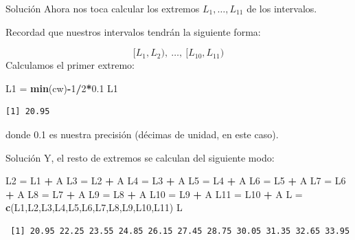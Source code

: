 \documentclass[
  ignorenonframetext,
]{beamer}
\newenvironment{Shaded}{\begin{snugshade}}{\end{snugshade}}
\newcommand{\DecValTok}[1]{\textcolor[rgb]{0.00,0.00,0.81}{#1}}
\newcommand{\FloatTok}[1]{\textcolor[rgb]{0.00,0.00,0.81}{#1}}
\newcommand{\FunctionTok}[1]{\textcolor[rgb]{0.13,0.29,0.53}{\textbf{#1}}}
\newcommand{\NormalTok}[1]{#1}
\newcommand{\OtherTok}[1]{\textcolor[rgb]{0.56,0.35,0.01}{#1}}
\newcommand{\SpecialCharTok}[1]{\textcolor[rgb]{0.81,0.36,0.00}{\textbf{#1}}}
\begin{document}
\begin{frame}[fragile]{Solución}
\label{soluciuxf3n-5}
Ahora nos toca calcular los extremos \(L_1,\dots,L_{11}\) de los
intervalos.

Recordad que nuestros intervalos tendrán la siguiente forma:

\[[L_1,L_2),\ \dots,\ [L_{10},L_{11})\] Calculamos el primer extremo:

\begin{Shaded}
\begin{Highlighting}[]
\NormalTok{L1 }\OtherTok{=} \FunctionTok{min}\NormalTok{(cw)}\SpecialCharTok{{-}}\DecValTok{1}\SpecialCharTok{/}\DecValTok{2}\SpecialCharTok{*}\FloatTok{0.1}
\NormalTok{L1}
\end{Highlighting}
\end{Shaded}

\begin{verbatim}
[1] 20.95
\end{verbatim}

donde 0.1 es nuestra precisión (décimas de unidad, en este caso).
\end{frame}

\begin{frame}[fragile]{Solución}
\label{soluciuxf3n-6}
Y, el resto de extremos se calculan del siguiente modo:

\begin{Shaded}
\begin{Highlighting}[]
\NormalTok{L2 }\OtherTok{=}\NormalTok{ L1 }\SpecialCharTok{+}\NormalTok{ A}
\NormalTok{L3 }\OtherTok{=}\NormalTok{ L2 }\SpecialCharTok{+}\NormalTok{ A}
\NormalTok{L4 }\OtherTok{=}\NormalTok{ L3 }\SpecialCharTok{+}\NormalTok{ A}
\NormalTok{L5 }\OtherTok{=}\NormalTok{ L4 }\SpecialCharTok{+}\NormalTok{ A}
\NormalTok{L6 }\OtherTok{=}\NormalTok{ L5 }\SpecialCharTok{+}\NormalTok{ A}
\NormalTok{L7 }\OtherTok{=}\NormalTok{ L6 }\SpecialCharTok{+}\NormalTok{ A}
\NormalTok{L8 }\OtherTok{=}\NormalTok{ L7 }\SpecialCharTok{+}\NormalTok{ A}
\NormalTok{L9 }\OtherTok{=}\NormalTok{ L8 }\SpecialCharTok{+}\NormalTok{ A}
\NormalTok{L10 }\OtherTok{=}\NormalTok{ L9 }\SpecialCharTok{+}\NormalTok{ A}
\NormalTok{L11 }\OtherTok{=}\NormalTok{ L10 }\SpecialCharTok{+}\NormalTok{ A}
\NormalTok{L }\OtherTok{=} \FunctionTok{c}\NormalTok{(L1,L2,L3,L4,L5,L6,L7,L8,L9,L10,L11)}
\NormalTok{L}
\end{Highlighting}
\end{Shaded}

\begin{verbatim}
 [1] 20.95 22.25 23.55 24.85 26.15 27.45 28.75 30.05 31.35 32.65 33.95
\end{verbatim}
\end{frame}
\end{document}

